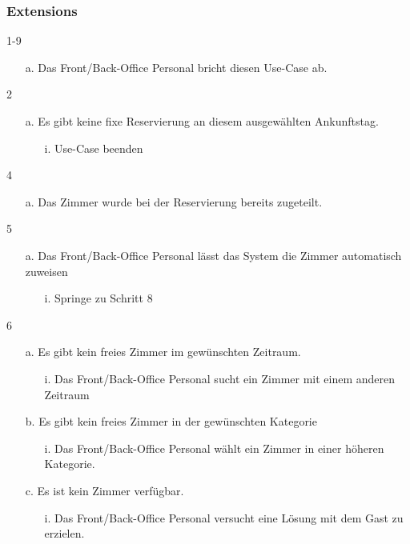 \documentclass[./detailed_overview_usecases.tex]{subfiles}
\begin{document}
    \subsubsection*{Extensions}
    \item 1-9 \begin{itemize}
                   \item[a.] Das Front/Back-Office Personal bricht diesen Use-Case ab.
    \end{itemize}
    \item 2 \begin{itemize}
                \item[a.] Es gibt keine fixe Reservierung an diesem ausgewählten Ankunftstag.
                \begin{itemize}
                    \item[i.] Use-Case beenden
                \end{itemize}
    \end{itemize}
    \item 4 \begin{itemize}
                \item[a.] Das Zimmer wurde bei der Reservierung bereits zugeteilt.
    \end{itemize}
    \item 5 \begin{itemize}
                \item[a.] Das Front/Back-Office Personal lässt das System die Zimmer automatisch zuweisen
                \begin{itemize}
                    \item[i.] Springe zu Schritt 8
                \end{itemize}
    \end{itemize}
    \item 6 \begin{itemize}
                \item[a.] Es gibt kein freies Zimmer im gewünschten Zeitraum.
                \begin{itemize}
                    \item[i.] Das Front/Back-Office Personal sucht ein Zimmer mit einem anderen Zeitraum
                \end{itemize}
                \item[b.] Es gibt kein freies Zimmer in der gewünschten Kategorie
                \begin{itemize}
                    \item[i.] Das Front/Back-Office Personal wählt ein Zimmer in einer höheren Kategorie.
                \end{itemize}
                \item[c.] Es ist kein Zimmer verfügbar.
                \begin{itemize}
                    \item[i.] Das Front/Back-Office Personal versucht eine Lösung mit dem Gast zu erzielen.
                \end{itemize}
    \end{itemize}
\end{document}
